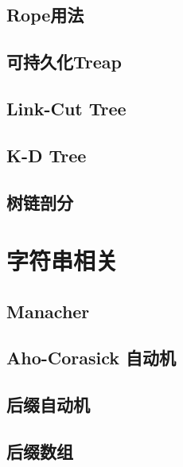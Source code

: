 \documentclass[10pt]{article}
\begin{document}
	\subsection{Rope用法}
		
	
	\subsection{可持久化Treap}
		
	
	\subsection{Link-Cut Tree}
		

	\subsection{K-D Tree}
		

	\subsection{树链剖分}
		

\section{字符串相关}
	\subsection{Manacher}
		

		\subsection{Aho-Corasick 自动机}
		

	\subsection{后缀自动机}
		

	\subsection{后缀数组}
		
\end{document}
